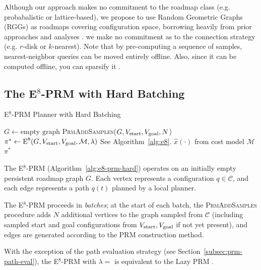 Although
our approach makes no commitment to the roadmap class
(e.g. probabalistic or lattice-based),
we propose to use Random Geometric Graphs (RGGs)
as roadmaps covering configuration space,
borrowing heavily from prior approaches \cite{kavrakietal1996prm}
and analyses \cite{karaman2011samplingoptimal}.
we make no commitment as to the connection strategy
(e.g. $r$-disk or $k$-nearest).
Note that by pre-computing a sequence of samples,
nearest-neighbor queries can be moved entirely offline.
Also,
since it can be computed offline,
you can sparsify it \cite{shaharabani2013sparsification}.

\subsection{The E$^8$-PRM with Hard Batching}

\begin{algorithm}
\caption{E$^8$-PRM Planner with Hard Batching}
\label{alg:e8-prm-hard}
\begin{algorithmic}[1]
\State $G \leftarrow \mbox{empty graph}$
\Loop
   \State \textsc{PrmAddSamples}($G,
      V_{\mbox{\scriptsize start}}, V_{\mbox{\scriptsize goal}},
      N$)
   \State $\pi^* \leftarrow \mbox{E}^8(G,
      V_{\mbox{\scriptsize start}}, V_{\mbox{\scriptsize goal}},
      \mathcal{M}, \lambda)$
      \Comment See Algorithm~\ref{alg:e8}.
      \Comment $\hat{x}(\cdot)$ from cost model $\mathcal{M}$
      \State \Return $\pi^*$
   \EndIf
\EndLoop
\EndProcedure
\end{algorithmic}
\end{algorithm}

The E$^8$-PRM (Algorithm~\ref{alg:e8-prm-hard})
operates on an initially empty persistent roadmap graph $G$.
Each vertex represents a configuration $q \in \mathcal{C}$,
and each edge represents a path $q(t)$ planned by a local planner.

The E$^8$-PRM proceeds in \emph{batches};
at the start of each batch,
the \textsc{PrmAddSamples} procedure adds
$N$ additional vertices to the graph sampled from $\mathcal{C}$
(including sampled start and goal configurations from
$V_{\mbox{\scriptsize start}}, V_{\mbox{\scriptsize goal}}$
if not yet present),
and edges are generated according to the PRM construction method.

With the exception of the path evaluation strategy
(see Section~\ref{subsec:prm-path-eval}),
the E$^8$-PRM with $\lambda = $
is equivalent to 
the Lazy PRM \cite{bohlin2000lazyprm}.

